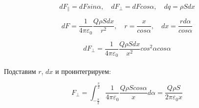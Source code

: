 \documentclass[dvipdfmx]{article}
\begin{document}
\paragraph{}
\noindent{}
\paragraph{}

\begin{equation*}
  dF_\parallel = dFsin\alpha, \quad dF_\perp = dFcos\alpha, \quad dq = \rho Sdx
\end{equation*}

\begin{equation*}
  dF = \frac{1}{4\pi\varepsilon_0}\frac{Q\rho Sdx}{r^2}, \quad r = \frac{x}{cos\alpha},
  \quad dx = \frac{rd\alpha}{cos\alpha}
\end{equation*}

\begin{equation*}
  dF_\perp = \frac{1}{4\pi\varepsilon_0}\frac{Q\rho Sdx}{x^2}cos^2\alpha cos\alpha
\end{equation*}
\paragraph{}

Подставим $r$, $dx$ и проинтегрируем:

\begin{equation*}
  F_\perp = \int_{-\frac{\pi}{2}}^{\frac{\pi}{2}}\frac{1}{4\pi\varepsilon_0}\frac{Q\rho Scos\alpha}{x}d\alpha =
  \frac{Q\rho S}{2\pi\varepsilon_0x}
\end{equation*}
\end{document}

